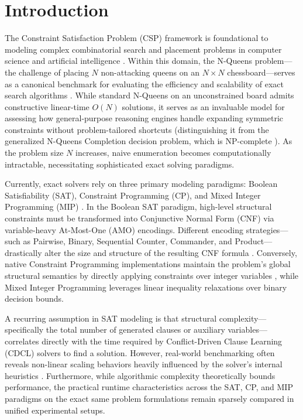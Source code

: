 \section{Introduction}
\label{sec:intro}

The Constraint Satisfaction Problem (CSP) framework is foundational to modeling complex combinatorial search and placement problems in computer science and artificial intelligence \citep{russell2010artificial}. Within this domain, the N-Queens problem---the challenge of placing $N$ non-attacking queens on an $N \times N$ chessboard---serves as a canonical benchmark for evaluating the efficiency and scalability of exact search algorithms \citep{bell2009solving}. While standard N-Queens on an unconstrained board admits constructive linear-time $O(N)$ solutions, it serves as an invaluable model for assessing how general-purpose reasoning engines handle expanding symmetric constraints without problem-tailored shortcuts (distinguishing it from the generalized N-Queens Completion decision problem, which is NP-complete \citep{gent2017complexity}). As the problem size $N$ increases, naive enumeration becomes computationally intractable, necessitating sophisticated exact solving paradigms.

Currently, exact solvers rely on three primary modeling paradigms: Boolean Satisfiability (SAT), Constraint Programming (CP), and Mixed Integer Programming (MIP) \citep{gomes2008satisfiability, rossi2006handbook, wolsey2020integer}. In the Boolean SAT paradigm, high-level structural constraints must be transformed into Conjunctive Normal Form (CNF) via variable-heavy At-Most-One (AMO) encodings. Different encoding strategies---such as Pairwise, Binary, Sequential Counter, Commander, and Product---drastically alter the size and structure of the resulting CNF formula \citep{sinz2005towards, frisch2010sat}. Conversely, native Constraint Programming implementations maintain the problem's global structural semantics by directly applying constraints over integer variables \citep{regin1994filtering}, while Mixed Integer Programming leverages linear inequality relaxations over binary decision bounds.

A recurring assumption in SAT modeling is that structural complexity---specifically the total number of generated clauses or auxiliary variables---correlates directly with the time required by Conflict-Driven Clause Learning (CDCL) solvers to find a solution. However, real-world benchmarking often reveals non-linear scaling behaviors heavily influenced by the solver's internal heuristics \citep{marques2009conflict}. Furthermore, while algorithmic complexity theoretically bounds performance, the practical runtime characteristics across the SAT, CP, and MIP paradigms on the exact same problem formulations remain sparsely compared in unified experimental setups.

